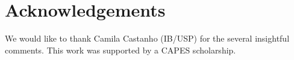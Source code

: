 \section*{Acknowledgements}
We would like to thank Camila Castanho (IB/USP) for the several insightful comments.
This work was supported by a CAPES scholarship.
